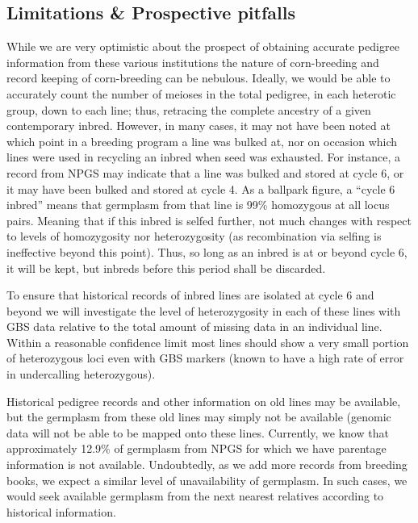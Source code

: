 \documentclass[12pt]{article}
\begin{document}
\subsection*{Limitations \& Prospective pitfalls}
While we are very optimistic about the prospect of obtaining accurate pedigree information from these various institutions the nature of corn-breeding and record keeping of corn-breeding can be nebulous. Ideally, we would be able to accurately count the number of meioses in the total pedigree, in each heterotic group, down to each line; thus, retracing the complete ancestry of a given contemporary inbred. However, in many cases, it may not have been noted at which point in a breeding program a line was bulked at, nor on occasion which lines were used in recycling an inbred when seed was exhausted. For instance, a record from NPGS may indicate that a line was bulked and stored at cycle 6, or it may have been bulked and stored at cycle 4. As a ballpark figure, a ``cycle 6 inbred'' means that germplasm from that line is 99\% homozygous at all locus pairs. Meaning that if this inbred is selfed further, not much changes with respect to levels of homozygosity nor heterozygosity (as recombination via selfing is ineffective beyond this point).  Thus, so long as an inbred is at or beyond cycle 6, it will be kept, but inbreds before this period shall be discarded.

\par To ensure that historical records of inbred lines are isolated at cycle 6 and beyond we will investigate the level of heterozygosity in each of these lines with GBS data relative to the total amount of missing data in an individual line. Within a reasonable confidence limit most lines should show a very small portion of heterozygous loci even with GBS markers (known to have a high rate of error in undercalling heterozygous). 

\par Historical pedigree records and other information on old lines may be available, but the germplasm from these old lines may simply not be available (genomic data will not be able to be mapped onto these lines. Currently, we know that approximately 12.9\% of germplasm from NPGS for which we have parentage information is not available. Undoubtedly, as we add more records from breeding books, we expect a similar level of unavailability of germplasm.  In such cases, we would seek available germplasm from the next nearest relatives according to historical information. 
\end{document}
